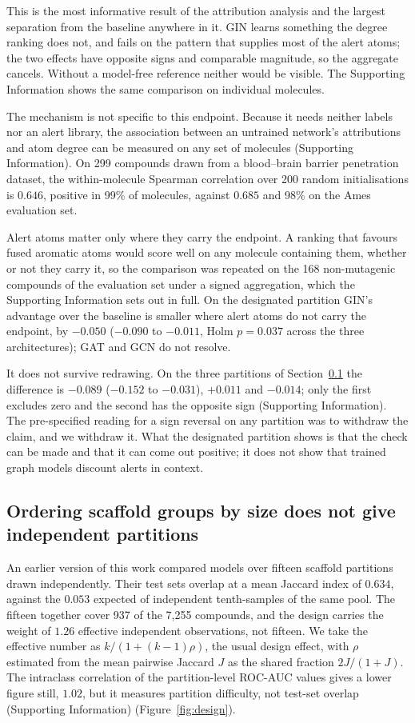 \documentclass[journal=jcisd8,manuscript=article]{achemso}
\begin{document}
This is the most informative result of the attribution analysis and the largest separation
from the baseline anywhere in it. GIN learns something the degree ranking does not, and fails
on the pattern that supplies most of the alert atoms; the two effects have opposite signs and
comparable magnitude, so the aggregate cancels. Without a model-free reference neither would
be visible. The Supporting Information shows the same comparison on individual molecules.

The mechanism is not specific to this endpoint. Because it needs neither labels nor an
alert library, the association between an untrained network's attributions and atom degree
can be measured on any set of molecules (Supporting Information). On 299 compounds drawn from a blood--brain barrier penetration dataset, the
within-molecule Spearman correlation over 200 random initialisations is $0.646$, positive in
99\% of molecules, against $0.685$ and 98\% on the Ames evaluation set.

Alert atoms matter only where they carry the endpoint. A ranking that favours fused aromatic
atoms would score well on any molecule containing them, whether or not they carry it, so the
comparison was repeated on the 168
non-mutagenic compounds of the evaluation set under a signed aggregation, which the Supporting
Information sets out in full. On the designated partition GIN's advantage over the baseline
is smaller where alert atoms do not carry the endpoint, by $-0.050$ ($-0.090$ to $-0.011$,
Holm $p = 0.037$ across the three architectures); GAT and GCN do not resolve.

It does not survive redrawing. On the three partitions of Section~\ref{sec:partition} the
difference is $-0.089$ ($-0.152$ to $-0.031$), $+0.011$ and $-0.014$; only the first excludes
zero and the second has the opposite sign (Supporting Information). The pre-specified reading for a sign
reversal on any partition was to withdraw the claim, and we withdraw it. What the designated
partition shows is that the check can be made and that it can come out positive; it does not
show that trained graph models discount alerts in context.


\subsection{Ordering scaffold groups by size does not give independent partitions}
\label{sec:partition}

An earlier version of this work compared models over fifteen scaffold partitions drawn
independently. Their test sets overlap at a mean Jaccard index of $0.634$, against the
$0.053$ expected of independent tenth-samples of the same pool. The fifteen together cover
937 of the 7,255 compounds, and the design carries the weight of $1.26$ effective independent
observations, not fifteen. We take the effective number as $k/(1 + (k-1)\rho)$, the
usual design effect, with $\rho$ estimated from the mean pairwise Jaccard $J$ as the shared
fraction $2J/(1+J)$. The intraclass correlation of the partition-level ROC-AUC values gives a
lower figure still, $1.02$, but it measures partition difficulty, not test-set overlap
(Supporting Information) (Figure~\ref{fig:design}).
\end{document}
